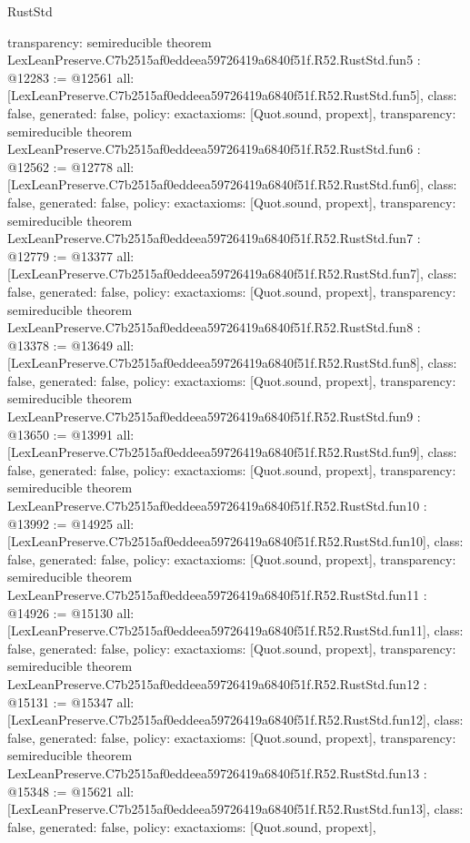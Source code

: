 \begin{lexlean}{RustStd}
\begin{coremodule}
{  transparency: semireducible
}
theorem LexLeanPreserve.C7b2515af0eddeea59726419a6840f51f.R52.RustStd.fun5 : @12283 := @12561 {
  all: [LexLeanPreserve.C7b2515af0eddeea59726419a6840f51f.R52.RustStd.fun5],
  class: false,
  generated: false,
  policy: exact{axioms: [Quot.sound, propext]},
  transparency: semireducible
}
theorem LexLeanPreserve.C7b2515af0eddeea59726419a6840f51f.R52.RustStd.fun6 : @12562 := @12778 {
  all: [LexLeanPreserve.C7b2515af0eddeea59726419a6840f51f.R52.RustStd.fun6],
  class: false,
  generated: false,
  policy: exact{axioms: [Quot.sound, propext]},
  transparency: semireducible
}
theorem LexLeanPreserve.C7b2515af0eddeea59726419a6840f51f.R52.RustStd.fun7 : @12779 := @13377 {
  all: [LexLeanPreserve.C7b2515af0eddeea59726419a6840f51f.R52.RustStd.fun7],
  class: false,
  generated: false,
  policy: exact{axioms: [Quot.sound, propext]},
  transparency: semireducible
}
theorem LexLeanPreserve.C7b2515af0eddeea59726419a6840f51f.R52.RustStd.fun8 : @13378 := @13649 {
  all: [LexLeanPreserve.C7b2515af0eddeea59726419a6840f51f.R52.RustStd.fun8],
  class: false,
  generated: false,
  policy: exact{axioms: [Quot.sound, propext]},
  transparency: semireducible
}
theorem LexLeanPreserve.C7b2515af0eddeea59726419a6840f51f.R52.RustStd.fun9 : @13650 := @13991 {
  all: [LexLeanPreserve.C7b2515af0eddeea59726419a6840f51f.R52.RustStd.fun9],
  class: false,
  generated: false,
  policy: exact{axioms: [Quot.sound, propext]},
  transparency: semireducible
}
theorem LexLeanPreserve.C7b2515af0eddeea59726419a6840f51f.R52.RustStd.fun10 : @13992 := @14925 {
  all: [LexLeanPreserve.C7b2515af0eddeea59726419a6840f51f.R52.RustStd.fun10],
  class: false,
  generated: false,
  policy: exact{axioms: [Quot.sound, propext]},
  transparency: semireducible
}
theorem LexLeanPreserve.C7b2515af0eddeea59726419a6840f51f.R52.RustStd.fun11 : @14926 := @15130 {
  all: [LexLeanPreserve.C7b2515af0eddeea59726419a6840f51f.R52.RustStd.fun11],
  class: false,
  generated: false,
  policy: exact{axioms: [Quot.sound, propext]},
  transparency: semireducible
}
theorem LexLeanPreserve.C7b2515af0eddeea59726419a6840f51f.R52.RustStd.fun12 : @15131 := @15347 {
  all: [LexLeanPreserve.C7b2515af0eddeea59726419a6840f51f.R52.RustStd.fun12],
  class: false,
  generated: false,
  policy: exact{axioms: [Quot.sound, propext]},
  transparency: semireducible
}
theorem LexLeanPreserve.C7b2515af0eddeea59726419a6840f51f.R52.RustStd.fun13 : @15348 := @15621 {
  all: [LexLeanPreserve.C7b2515af0eddeea59726419a6840f51f.R52.RustStd.fun13],
  class: false,
  generated: false,
  policy: exact{axioms: [Quot.sound, propext]},
}
\end{coremodule}
\end{lexlean}

